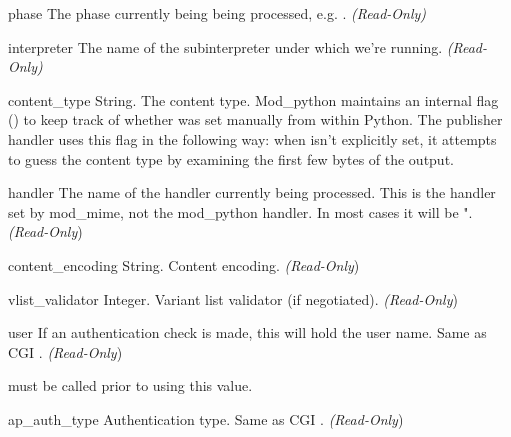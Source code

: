 \begin{memberdesc}[request]{phase}
  The phase currently being being processed, e.g. .
  \emph{(Read-Only)}
\end{memberdesc}

\begin{memberdesc}[request]{interpreter}
  The name of the subinterpreter under which we're running.
  \emph{(Read-Only)}
\end{memberdesc}

\begin{memberdesc}[request]{content_type}
  String. The content type. Mod_python maintains an internal flag
  () to keep track of whether
   was set manually from within Python. The
  publisher handler uses this flag in the following way: when
   isn't explicitly set, it attempts to guess the
  content type by examining the first few bytes of the output.
\end{memberdesc}

\begin{memberdesc}[request]{handler}
  The name of the handler currently being processed. This is the handler
  set by mod_mime, not the mod_python handler. In most cases it will be
  ". \emph{(Read-Only})
\end{memberdesc}

\begin{memberdesc}[request]{content_encoding}
  String. Content encoding.
  \emph{(Read-Only})
\end{memberdesc}

\begin{memberdesc}[request]{vlist_validator}
  Integer. Variant list validator (if negotiated).
  \emph{(Read-Only})
\end{memberdesc}

\begin{memberdesc}[request]{user}
  If an authentication check is made, this will hold the user
  name. Same as CGI .
  \emph{(Read-Only})
  \begin{notice}
     must be called prior to using this value.
  \end{notice}
\end{memberdesc}

\begin{memberdesc}[request]{ap_auth_type}
  Authentication type. Same as CGI .
  \emph{(Read-Only})
\end{memberdesc}

